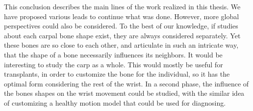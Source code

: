 \documentclass[../../Main.tex]{subfiles}
\begin{document}
This conclusion describes the main lines of the work realized in this thesis. We have proposed various leads to continue what was done. However, more global perspectives could also be considered. To the best of our knowledge, if studies about each carpal bone shape exist, they are always considered separately. Yet these bones are so close to each other, and articulate in such an intricate way, that the shape of a bone necessarily influences its neighbors. It would be interesting to study the carp as a whole. This would mostly be useful for transplants, in order to customize the bone for the individual, so it has the optimal form considering the rest of the wrist. In a second phase, the influence of the bones shapes on the wrist movement could be studied, with the similar idea of customizing a healthy motion model that could be used for diagnosing.



\subfileLocal{
	\pagestyle{empty}
	
	
}
\relax

\endgroup
\end{document}

